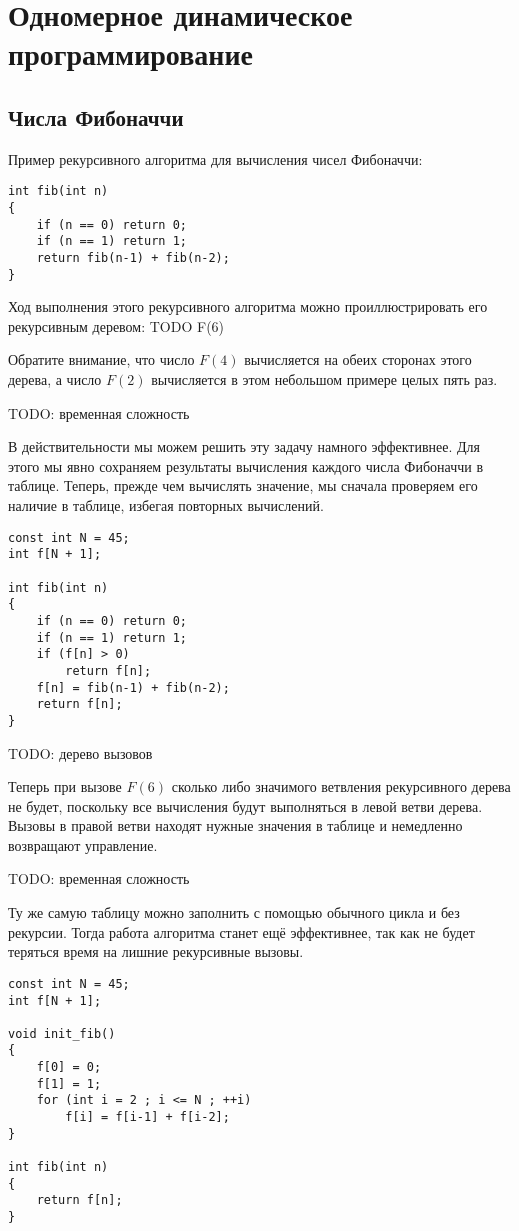 \documentclass[14pt]{book}
\begin{document}
\section{Одномерное динамическое программирование}

\subsection{Числа Фибоначчи}

Пример рекурсивного алгоритма для вычисления чисел Фибоначчи:

\begin{lstlisting}
int fib(int n)
{
    if (n == 0) return 0;
    if (n == 1) return 1;
    return fib(n-1) + fib(n-2);
}
\end{lstlisting}

Ход выполнения этого рекурсивного алгоритма можно проиллюстрировать его рекурсивным
деревом: TODO F(6)

Обратите внимание, что число $F(4)$ вычисляется на обеих сторонах этого дерева, а число
$F(2)$ вычисляется в этом небольшом примере целых пять раз.

TODO: временная сложность

В действительности мы можем решить эту задачу намного эффективнее. Для этого мы явно сохраняем
результаты вычисления каждого числа Фибоначчи в таблице. Теперь, прежде чем вычислять
значение, мы сначала проверяем его наличие в таблице, избегая повторных вычислений.

\begin{lstlisting}
const int N = 45;
int f[N + 1];

int fib(int n)
{
    if (n == 0) return 0;
    if (n == 1) return 1;
    if (f[n] > 0)
        return f[n];
    f[n] = fib(n-1) + fib(n-2);
    return f[n];
}
\end{lstlisting}

TODO: дерево вызовов

Теперь при вызове $F(6)$ сколько либо значимого ветвления рекурсивного дерева не будет,
поскольку все вычисления будут выполняться в левой ветви дерева. Вызовы в правой ветви
находят нужные значения в таблице и немедленно возвращают управление.

TODO: временная сложность

Ту же самую таблицу можно заполнить с помощью обычного цикла и без рекурсии.
Тогда работа алгоритма станет ещё эффективнее, так как не будет теряться время на
лишние рекурсивные вызовы.

\begin{lstlisting}
const int N = 45;
int f[N + 1];

void init_fib()
{
    f[0] = 0;
    f[1] = 1;
    for (int i = 2 ; i <= N ; ++i)
        f[i] = f[i-1] + f[i-2];
}

int fib(int n)
{
    return f[n];
}
\end{lstlisting}
\end{document}
